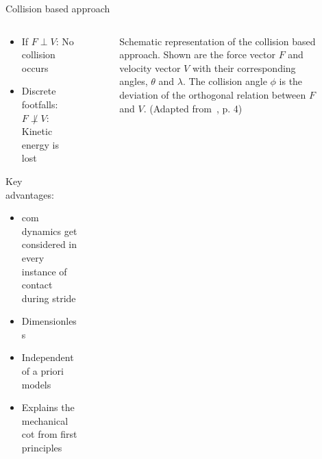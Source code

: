 \begin{frame}[fragile=singleslide]{Collision based approach}%
    \begin{columns}[T,onlytextwidth]%
        \begin{column}[T]{0.48\textwidth}%
            \begin{itemize}
                \item If $F \perp V$: No collision occurs
                \item Discrete footfalls: $F \not\perp V$: Kinetic energy is lost~\cite{Biewener2018}
            \end{itemize}%
            Key advantages:~\cite{Lee2013}
            \begin{itemize}
                \item \acrfull{com} dynamics get considered in every instance of contact during stride
                \item Dimensionless %
                \item Independent of a priori models %
                \item Explains the mechanical \acrfull{cot} from first principles
            \end{itemize}%
        \end{column}%
        \begin{column}[T]{0.48\textwidth}%
            \begin{figure}[htb]%
                \centering%
                \caption{Schematic representation of the collision based approach. Shown are the force vector $F$ and velocity vector $V$ with their corresponding angles, $\theta$ and $\lambda$. The collision angle $\phi$ is the deviation of the orthogonal relation between $F$ and $V$. (Adapted from~\cite{Lee2011}, p. 4)}%
                \label{fig:collision-based-approach}%
            \end{figure}%
        \end{column}%
    \end{columns}%
\end{frame}%
